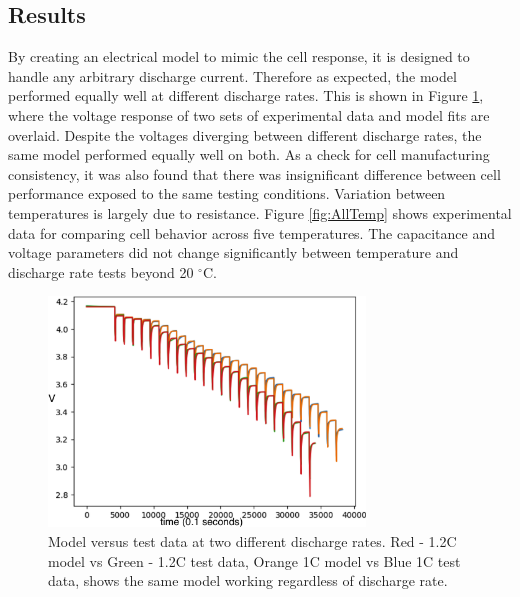 \documentclass[]{aiaa-tc}%
\begin{document}
\subsection{Results}

By creating an electrical model to mimic the cell response, it is designed to handle any arbitrary discharge current. Therefore as expected, the model performed equally well at different discharge rates. This is shown in Figure \ref{fig:paramE}, where the voltage response of two sets of experimental data and model fits are overlaid. Despite the voltages diverging between different discharge rates, the same model performed equally well on both. As a check for cell manufacturing consistency, it was also found that there was insignificant difference between cell performance exposed to the same testing conditions. Variation between temperatures is largely due to resistance.  Figure \ref{fig:AllTemp} shows experimental data for comparing cell behavior across five temperatures. The capacitance and voltage parameters did not change significantly between temperature and discharge rate tests beyond 20 $^\circ$C. 

\begin{figure}[!htb]
	\centering
	\includegraphics[width=0.75\textwidth]{figures/1_1o2C_20C_axes.png}
	\caption{Model versus test data at two different discharge rates. Red - 1.2C model vs Green - 1.2C test data, Orange 1C model vs Blue 1C test data, shows the same model working regardless of discharge rate.}
	\label{fig:paramE}
\end{figure}
\end{document}
